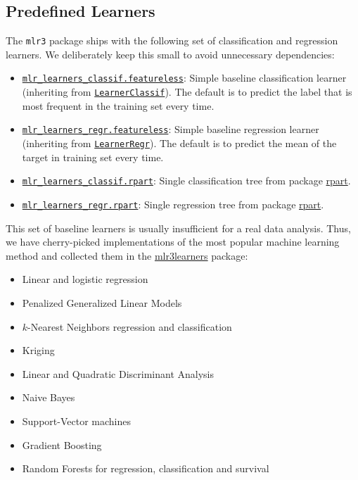 \documentclass[
]{scrbook}
\providecommand{\tightlist}{%
  \setlength{\itemsep}{0pt}\setlength{\parskip}{0pt}}
\begin{document}
\hypertarget{predefined-learners}{%
\subsection{Predefined Learners}\label{predefined-learners}}

The \texttt{mlr3} package ships with the following set of classification and regression learners.
We deliberately keep this small to avoid unnecessary dependencies:

\begin{itemize}
\tightlist
\item
  \href{https://mlr3.mlr-org.com/reference/mlr_learners_classif.featureless.html}{\texttt{mlr\_learners\_classif.featureless}}: Simple baseline classification learner (inheriting from \href{https://mlr3.mlr-org.com/reference/LearnerClassif.html}{\texttt{LearnerClassif}}).
  The default is to predict the label that is most frequent in the training set every time.
\item
  \href{https://mlr3.mlr-org.com/reference/mlr_learners_regr.featureless.html}{\texttt{mlr\_learners\_regr.featureless}}: Simple baseline regression learner (inheriting from \href{https://mlr3.mlr-org.com/reference/LearnerRegr.html}{\texttt{LearnerRegr}}).
  The default is to predict the mean of the target in training set every time.
\item
  \href{https://mlr3.mlr-org.com/reference/mlr_learners_classif.rpart.html}{\texttt{mlr\_learners\_classif.rpart}}: Single classification tree from package \href{https://cran.r-project.org/package=rpart}{rpart}.
\item
  \href{https://mlr3.mlr-org.com/reference/mlr_learners_regr.rpart.html}{\texttt{mlr\_learners\_regr.rpart}}: Single regression tree from package \href{https://cran.r-project.org/package=rpart}{rpart}.
\end{itemize}

This set of baseline learners is usually insufficient for a real data analysis.
Thus, we have cherry-picked implementations of the most popular machine learning method and collected them in the \href{https://mlr3learners.mlr-org.com}{mlr3learners} package:

\begin{itemize}
\tightlist
\item
  Linear and logistic regression
\item
  Penalized Generalized Linear Models
\item
  \(k\)-Nearest Neighbors regression and classification
\item
  Kriging
\item
  Linear and Quadratic Discriminant Analysis
\item
  Naive Bayes
\item
  Support-Vector machines
\item
  Gradient Boosting
\item
  Random Forests for regression, classification and survival
\end{itemize}
\end{document}
